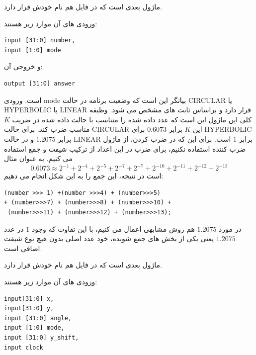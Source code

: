 \documentclass[12pt,titlepage,a4page , tikz , multi,table , svgnames,xcdraw]{article}
\begin{document}
\hrulefill

ماژول بعدی  است که در فایل هم نام خودش قرار دارد.

 
 ورودی های آن موارد زیر هستند:

\begin{latin}
\begin{verbatim}
input [31:0] number,
input [1:0] mode
\end{verbatim}
\end{latin}

و خروجی آن:

\begin{latin}
\begin{verbatim}
output [31:0] answer
\end{verbatim}
\end{latin}

است. ورودی mode بیانگر این است که وضعیت برنامه در حالت CIRCULAR یا HYPERBOLIC یا LINEAR قرار دارد و براساس ثابت های  مشخص می شود. وظیفه کلی این ماژول این است که عدد داده شده را متناسب با حالت داده شده در ضریب $K$ مناسب ضرب کند. برای حالت CIRCULAR این $K$ برابر $0.6073$ برای HYPERBOLIC برابر $1.2075$ و در حالت LINEAR برابر $1$ است. برای این که در ضرب کردن، از ماژول ضرب کننده استفاده نکنیم، برای ضرب در این اعداد از ترکیب شیفت و جمع استفاده می کنیم. به عنوان مثال
$$0.6073 \approx 2^{-1} + 2^{-4} + 2^{-5} + 2^{-7} + 2^{-7} + 2^{-10} + 2^{-11} + 2^{-12} + 2^{-13}$$
است در نتیجه، این جمع را به این شکل انجام می دهیم:

\begin{latin}
\begin{verbatim}
(number >>> 1) +(number >>>4) + (number>>>5)
+ (number>>>7) + (number>>>8) + (number>>>10) +
 (number>>>11) + (number>>>12) + (number>>>13);
\end{verbatim}
\end{latin}

در مورد $1.2075$ هم روش مشابهی اعمال می کنیم، با این تفاوت که وجود $1$ در عدد $1.2075$ یعنی یکی از بخش های جمع شونده، خود عدد اصلی بدون هیچ نوع شیفت اضافی است.

\hrulefill

ماژول بعدی  است که در فایل هم نام خودش قرار دارد.

 
 ورودی های آن موارد زیر هستند:

\begin{latin}
\begin{verbatim}
input[31:0] x,
input[31:0] y,
input [31:0] angle,
input [1:0] mode,
input [31:0] y_shift,
input clock
\end{verbatim}
\end{latin}
\end{document}

